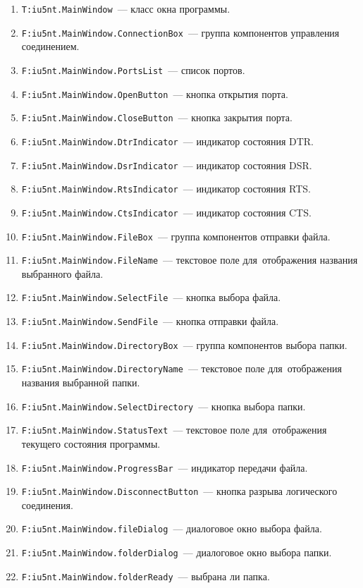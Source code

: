\documentclass[a4paper,12pt]{article}
\begin{document}
\begin{enumerate}[noitemsep]
\item \texttt{T:iu5nt.MainWindow}~--- класс окна программы.
\item \texttt{F:iu5nt.MainWindow.ConnectionBox}~--- группа компонентов управления соединением.
\item \texttt{F:iu5nt.MainWindow.PortsList}~--- список портов.
\item \texttt{F:iu5nt.MainWindow.OpenButton}~--- кнопка открытия порта.
\item \texttt{F:iu5nt.MainWindow.CloseButton}~--- кнопка закрытия порта.
\item \texttt{F:iu5nt.MainWindow.DtrIndicator}~--- индикатор состояния DTR.
\item \texttt{F:iu5nt.MainWindow.DsrIndicator}~--- индикатор состояния DSR.
\item \texttt{F:iu5nt.MainWindow.RtsIndicator}~--- индикатор состояния RTS.
\item \texttt{F:iu5nt.MainWindow.CtsIndicator}~--- индикатор состояния CTS.
\item \texttt{F:iu5nt.MainWindow.FileBox}~--- группа компонентов отправки файла.
\item \texttt{F:iu5nt.MainWindow.FileName}~--- текстовое поле для~отображения названия выбранного файла.
\item \texttt{F:iu5nt.MainWindow.SelectFile}~--- кнопка выбора файла.
\item \texttt{F:iu5nt.MainWindow.SendFile}~--- кнопка отправки файла.
\item \texttt{F:iu5nt.MainWindow.DirectoryBox}~--- группа компонентов выбора папки.
\item \texttt{F:iu5nt.MainWindow.DirectoryName}~--- текстовое поле для~отображения названия выбранной папки.
\item \texttt{F:iu5nt.MainWindow.SelectDirectory}~--- кнопка выбора папки.
\item \texttt{F:iu5nt.MainWindow.StatusText}~--- текстовое поле для~отображения текущего состояния программы.
\item \texttt{F:iu5nt.MainWindow.ProgressBar}~--- индикатор передачи файла.
\item \texttt{F:iu5nt.MainWindow.DisconnectButton}~--- кнопка разрыва логического соединения.
\item \texttt{F:iu5nt.MainWindow.fileDialog}~--- диалоговое окно выбора файла.
\item \texttt{F:iu5nt.MainWindow.folderDialog}~--- диалоговое окно выбора папки.
\item \texttt{F:iu5nt.MainWindow.folderReady}~--- выбрана ли папка.

\end{enumerate}
\end{document}
